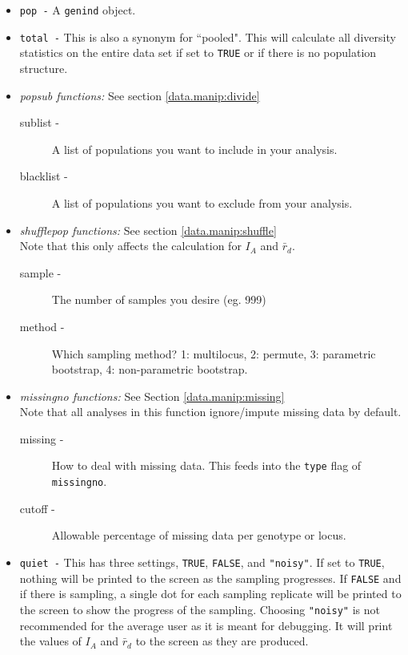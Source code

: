 \documentclass[letterpaper]{article}
\begin{document}
\begin{itemize}
  \item \texttt{pop -} A \texttt{genind} object.
  \item \texttt{total -} This is also a synonym for ``pooled". This will calculate all diversity statistics on the entire data set if set to \texttt{TRUE} or if there is no population structure.
  \item \emph{popsub functions:} See section \ref{data.manip:divide}
  \begin{description}
    \item[sublist -] A list of populations you want to include in your analysis.
    \item[blacklist -] A list of populations you want to exclude from your analysis.
  \end{description}
  \item \emph{shufflepop functions:} See section \ref{data.manip:shuffle} \\ Note that this only affects the calculation for $I_A$ and $\bar r_d$.
  \begin{description}
    \item[sample -] The number of samples you desire (eg. 999)
    \item[method -] Which sampling method? 1: multilocus, 2: permute, 3: parametric bootstrap, 4: non-parametric bootstrap.
  \end{description}
  \item \emph{missingno functions:} See Section \ref{data.manip:missing} \\ Note that all analyses in this function ignore/impute missing data by default.
    \begin{description}
      \item[missing -] How to deal with missing data. This feeds into the \texttt{type} flag of \texttt{missingno}.
      \item[cutoff -] Allowable percentage of missing data per genotype or locus.
    \end{description}
  \item \texttt{quiet -} This has three settings, \texttt{TRUE}, \texttt{FALSE}, and \texttt{"noisy"}. If set to \texttt{TRUE}, nothing will be printed to the screen as the sampling progresses. If \texttt{FALSE} and if there is sampling, a single dot for each sampling replicate will be printed to the screen to show the progress of the sampling. Choosing \texttt{"noisy"} is not recommended for the average user as it is meant for debugging. It will print the values of $I_A$ and $\bar r_d$ to the screen as they are produced. 

\end{itemize}
\end{document}
